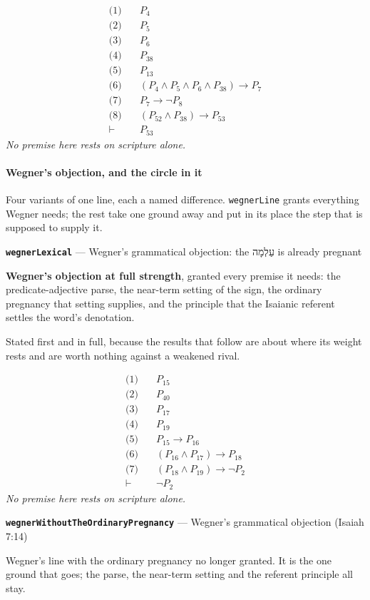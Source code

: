 \documentclass[11pt]{article}
\begin{document}
\begin{align*}
  \text{(1)} \quad & P_{4} \\
  \text{(2)} \quad & P_{5} \\
  \text{(3)} \quad & P_{6} \\
  \text{(4)} \quad & P_{38} \\
  \text{(5)} \quad & P_{13} \\
  \text{(6)} \quad & (P_{4} \land P_{5} \land P_{6} \land P_{38}) \rightarrow P_{7} \\
  \text{(7)} \quad & P_{7} \rightarrow \lnot P_{8} \\
  \text{(8)} \quad & (P_{52} \land P_{38}) \rightarrow P_{53} \\
  \vdash \quad & P_{53}
\end{align*}
\emph{No premise here rests on scripture alone.}
\paragraph*{Wegner's objection, and the circle in it}
\leavevmode\par
Four variants of one line, each a named difference. \texttt{wegner\allowbreak{}Line} grants everything Wegner needs; the rest take one ground away and put in its place the step that is supposed to supply it.

\par\medskip\noindent\textbf{\texttt{wegner\allowbreak{}Lexical}} --- Wegner's grammatical objection: the עַלְמָה is already pregnant\par\nobreak\noindent
\textbf{Wegner's objection at full strength}, granted every premise it needs: the predicate-adjective parse, the near-term setting of the sign, the ordinary pregnancy that setting supplies, and the principle that the Isaianic referent settles the word's denotation.

Stated first and in full, because the results that follow are about where its weight rests and are worth nothing against a weakened rival.

\begin{align*}
  \text{(1)} \quad & P_{15} \\
  \text{(2)} \quad & P_{40} \\
  \text{(3)} \quad & P_{17} \\
  \text{(4)} \quad & P_{19} \\
  \text{(5)} \quad & P_{15} \rightarrow P_{16} \\
  \text{(6)} \quad & (P_{16} \land P_{17}) \rightarrow P_{18} \\
  \text{(7)} \quad & (P_{18} \land P_{19}) \rightarrow \lnot P_{2} \\
  \vdash \quad & \lnot P_{2}
\end{align*}
\emph{No premise here rests on scripture alone.}
\par\medskip\noindent\textbf{\texttt{wegner\allowbreak{}Without\allowbreak{}The\allowbreak{}Ordinary\allowbreak{}Pregnancy}} --- Wegner's grammatical objection (Isaiah 7:14)\par\nobreak\noindent
Wegner's line with the ordinary pregnancy no longer granted. It is the one ground that goes; the parse, the near-term setting and the referent principle all stay.
\end{document}
